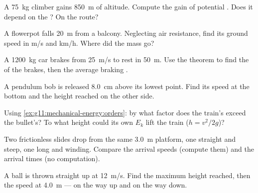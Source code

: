 \begin{exercise}[$\star$]\label{exo:g11:mechanical-energy:2}
A \qty{75}{kg} climber gains \qty{850}{m} of altitude. Compute the gain
of potential . Does it depend on the ? On the route?
\end{exercise}

\begin{exercise}[$\star$]\label{exo:g11:mechanical-energy:3}
A flowerpot falls \qty{20}{m} from a balcony. Neglecting air resistance,
find its ground speed in \unit{m/s} and \unit{km/h}. Where did the mass go?
\end{exercise}

\begin{exercise}[$\star$]\label{exo:g11:mechanical-energy:4}
A \qty{1200}{kg} car brakes from \qty{25}{m/s} to rest in \qty{50}{m}.
Use the  theorem to find the  of the brakes, then the
average braking .
\end{exercise}

\begin{exercise}[$\star$]\label{exo:g11:mechanical-energy:5}
A pendulum bob is released \qty{8.0}{cm} above its lowest point. Find
its speed at the bottom and the height reached on the other side.
\end{exercise}

\begin{exercise}[$\star\star$]\label{exo:g11:mechanical-energy:6}
Using \cref{ex:g11:mechanical-energy:orders}: by what factor does the
train's  exceed the bullet's? To what height could its own
$E_k$ lift the train ($h = v^2/2g$)?
\end{exercise}

\begin{exercise}[$\star\star$]\label{exo:g11:mechanical-energy:7}
Two frictionless slides drop from the same \qty{3.0}{m} platform, one
straight and steep, one long and winding. Compare the arrival speeds
(compute them) and the arrival times (no computation).
\end{exercise}

\begin{exercise}[$\star\star$]\label{exo:g11:mechanical-energy:8}
A ball is thrown straight up at \qty{12}{m/s}. Find the maximum height
reached, then the speed at \qty{4.0}{m} --- on the way up and on the way
down.
\end{exercise}

